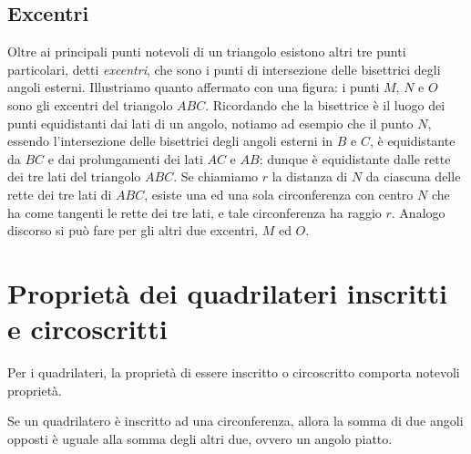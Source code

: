 \subsection{Excentri}

Oltre ai principali punti notevoli di un triangolo esistono altri tre 
punti particolari, detti \emph{excentri}, che sono i punti di 
intersezione delle bisettrici degli angoli esterni. Illustriamo 
quanto affermato con una figura: i punti \(M\), \(N\) e \(O\) sono gli 
excentri del triangolo \(ABC\). Ricordando che la bisettrice è il luogo 
dei punti equidistanti dai lati di un angolo, notiamo ad esempio che 
il punto \(N\), essendo l'intersezione delle bisettrici degli angoli 
esterni in \(B\) e \(C\), è equidistante da \(BC\) e dai prolungamenti dei 
lati \(AC\) e \(AB\): dunque è equidistante dalle rette dei tre lati del 
triangolo \(ABC\). Se chiamiamo \(r\) la distanza di \(N\) da ciascuna delle 
rette dei tre lati di \(ABC\), esiste una ed una sola circonferenza con 
centro \(N\) che ha come tangenti le rette dei tre lati, e tale 
circonferenza ha raggio \(r\). Analogo discorso si può fare per gli 
altri due excentri, \(M\) ed \(O\).


\begin{inaccessibleblock}
 \begin{figure}[htb]
	\centering
\end{figure}
\end{inaccessibleblock}


\section{Proprietà dei quadrilateri inscritti e 
circoscritti}\label{sect:quadrilateri_circonferenza}

Per i quadrilateri, la proprietà di essere inscritto o circoscritto 
comporta notevoli proprietà.

\begin{teorema}\label{teo:6.5}
Se un quadrilatero è inscritto ad una circonferenza, allora la somma 
di due angoli opposti è uguale alla somma degli altri due, ovvero un 
angolo piatto.
\end{teorema}


\begin{inaccessibleblock}
 \begin{figure}[htb]
	\centering
\end{figure}
\end{inaccessibleblock}

